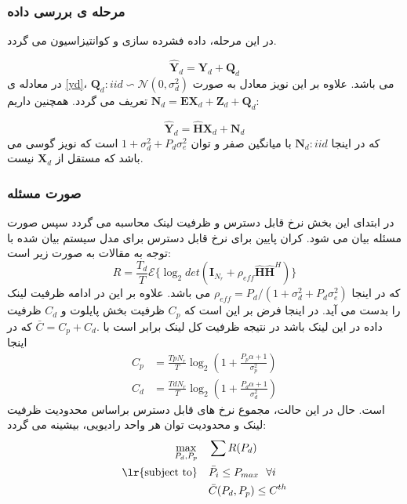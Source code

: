     
  \subsubsection{ مرحله ی بررسی داده  }
  در این مرحله، داده فشرده سازی و کوانتیزاسیون می گردد.
  
    \begin{equation}\label{yd}
      \hat{\boldsymbol{Y}}_{d} = \boldsymbol{Y}_{d} + \boldsymbol{Q}_{d}
      \end{equation}
      در معادله ی \eqref{yd}،  $\boldsymbol{Q}_{d} :iid \backsim \mathcal{N}(0,\sigma_{d}^2)$  می باشد.
علاوه بر این نویز معادل به صورت  $\boldsymbol{N}_{d}=\boldsymbol{E} \boldsymbol{X}_{d}+\boldsymbol{Z}_{d}+\boldsymbol{Q}_{d}$ تعریف می گردد.  
      همچنین داریم:
      
      
  \begin{equation}
  \hat{\boldsymbol{Y}}_{d} =  \hat{\boldsymbol{H}} \boldsymbol{X}_{d} + \boldsymbol{N}_{d}
  \end{equation}
  که در اینجا
    $\boldsymbol{N}_{d} :iid$
    با میانگین صفر و توان 
  $  1+\sigma_{d}^2 + P_d \sigma_{e}^2$
  است که نویز گوسی می باشد که مستقل از 
  $\boldsymbol{X}_{d} $
  نیست.
 \subsubsection{صورت مسئله}
 در ابتدای این بخش نرخ قابل دسترس و ظرفیت لینک محاسبه می گردد سپس  صورت مسئله بیان می شود.
 کران پایین برای نرخ قابل دسترس برای مدل سیستم بیان شده با توجه به مقالات به صورت زیر است:
 \begin{equation}
 R = \frac{T_d}{T} \mathcal{E}\{\log_2{det (\boldsymbol{I}_{N_r}+\rho_{eff} \hat{\boldsymbol{H}} \hat{\boldsymbol{H}}^{H} )}\}
 \end{equation}
 که در اینجا $\rho_{eff} = P_d / ( 1+\sigma_{d}^2 + P_d \sigma_{e}^2)$ می باشد.
 علاوه بر این در ادامه ظرفیت لینک  را بدست می آید. در اینجا فرض بر این است که  $C_p$ ظرفیت بخش پایلوت و $       C_d$   ظرفیت داده در این لینک باشد در نتیجه ظرفیت کل لینک برابر است با 
 $\bar{C} = C_p +C_d.$
که در اینجا
 \begin{equation}
 \begin{split}
 C_p & = \frac{Tp N_r}{T} \log_2 (1 + \frac{P_p \alpha +1}{\sigma_p^2})\\
  C_d & = \frac{Td N_r}{T} \log_2 (1 + \frac{P_d \alpha +1}{\sigma_d^2})
 \end{split}
 \end{equation}
 است.
 حال در این حالت، مجموع نرخ های قابل دسترس براساس محدودیت ظرفیت لینک  و محدودیت توان هر واحد رادیویی، بیشینه می گردد:
\begin{equation}
\begin{aligned}
\max\limits_{P_d,P_p}   \quad &   \sum R(P_d)\\
\text{\lr{subject to}} \quad  & \bar{P}_i \leq P_{max} \ \  \forall i \\
&\bar{C} ({P_d,P_p})\leq C^{th} \\
\end{aligned}
\end{equation}
